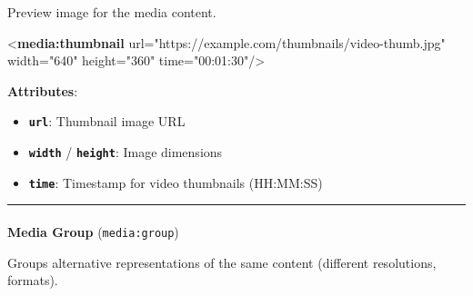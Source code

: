 \documentclass[
  letterpaper,
  DIV=11,
  numbers=noendperiod]{scrartcl}
\makeatletter
\let\oldparagraph\paragraph
\renewcommand{\paragraph}{
    \@ifstar
      \xxxParagraphStar
      \xxxParagraphNoStar
  }
\newcommand{\xxxParagraphStar}[1]{\oldparagraph*{#1}\mbox{}}
\newcommand{\xxxParagraphNoStar}[1]{\oldparagraph{#1}\mbox{}}
\newenvironment{Shaded}{\begin{snugshade}}{\end{snugshade}}
\newcommand{\KeywordTok}[1]{\textcolor[rgb]{0.00,0.23,0.31}{\textbf{#1}}}
\newcommand{\NormalTok}[1]{\textcolor[rgb]{0.00,0.23,0.31}{#1}}
\newcommand{\OtherTok}[1]{\textcolor[rgb]{0.00,0.23,0.31}{#1}}
\newcommand{\StringTok}[1]{\textcolor[rgb]{0.13,0.47,0.30}{#1}}
\providecommand{\tightlist}{%
  \setlength{\itemsep}{0pt}\setlength{\parskip}{0pt}}\usepackage{longtable,booktabs,array}
\makeatother
\begin{document}
Preview image for the media content.

\begin{Shaded}
\begin{Highlighting}[]
\NormalTok{\textless{}}\KeywordTok{media:thumbnail} 
\OtherTok{    url=}\StringTok{"https://example.com/thumbnails/video{-}thumb.jpg"}
\OtherTok{    width=}\StringTok{"640"}
\OtherTok{    height=}\StringTok{"360"}
\OtherTok{    time=}\StringTok{"00:01:30"}\NormalTok{/\textgreater{}}
\end{Highlighting}
\end{Shaded}

\textbf{Attributes}:

\begin{itemize}
\tightlist
\item
  \textbf{\texttt{url}}: Thumbnail image URL
\item
  \textbf{\texttt{width}} / \textbf{\texttt{height}}: Image dimensions
\item
  \textbf{\texttt{time}}: Timestamp for video thumbnails (HH:MM:SS)
\end{itemize}

\begin{center}\rule{0.5\linewidth}{0.5pt}\end{center}

\paragraph{\texorpdfstring{\textbf{Media Group}
(\texttt{media:group})}{Media Group (media:group)}}\label{media-group-mediagroup}

Groups alternative representations of the same content (different
resolutions, formats).
\end{document}
